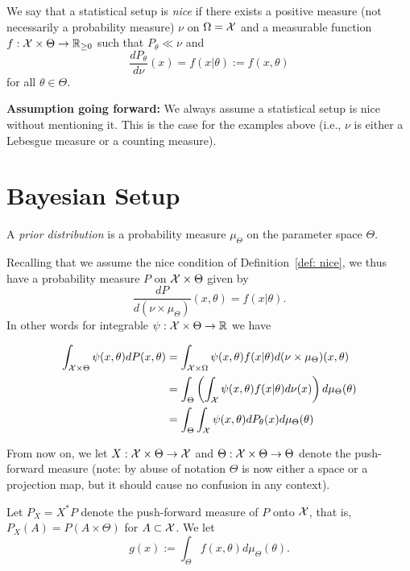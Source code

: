 \documentclass[twoside, a4paper, 10pt]{amsart}
\begin{document}
\begin{mydef} \label{def: nice} We say that a statistical setup is \textit{nice} if there exists a positive measure (not necessarily a probability measure) $\nu$ on $\Omega = \mathcal{X}$ and a measurable function $f:\mathcal{X} \times \Theta \to \mathbb{R}_{\geq 0}$ such that $P_{\theta} \ll \nu$ and $$\frac{dP_{\theta}}{d\nu} (x) = f(x|\theta) := f(x, \theta)$$ for all $\theta \in \Theta$.

\end{mydef}

\textbf{Assumption going forward:} We always assume a statistical setup is nice without mentioning it. This is the case for the examples above (i.e., $\nu$ is either a Lebesgue measure or a counting measure).

\section{Bayesian Setup}

\begin{mydef} A \textit{prior distribution} is a probability measure $\mu_{\Theta}$ on the parameter space $\Theta$. \end{mydef}

Recalling that we assume the nice condition of Definition~\ref{def: nice}, we thus have a probability measure $P$ on $\mathcal{X} \times \Theta$ given by $$\frac{dP}{d(\nu \times \mu_{\Theta})}(x,\theta) = f(x|\theta).$$ In other words for integrable $\psi:\mathcal{X} \times \Theta \to \mathbb{R}$ we have 

\begin{align*} \int_{\mathcal{X} \times \Theta} \psi(x,\theta) dP(x,\theta) &= \int_{\mathcal{X} \times \Omega } \psi(x,\theta) f(x|\theta) d(\nu \times \mu_{\Theta}) (x,\theta) \\ &= \int_{\Theta} \left( \int_{\mathcal{X}} \psi(x,\theta) f(x|\theta) d\nu(x) \right) d\mu_{\Theta}(\theta) \\
&=  \int_{\Theta} \int_{\mathcal{X}} \psi(x,\theta) dP_{\theta}(x) d\mu_{\Theta}(\theta)   \end{align*}

From now on, we let $X:\mathcal{X} \times \Theta \to \mathcal{X}$ and $\Theta:\mathcal{X} \times \Theta \to \Theta$ denote the push-forward measure (note: by abuse of notation $\Theta$ is now either a space or a projection map, but it should cause no confusion in any context).

Let $P_X=X^*P$ denote the push-forward measure of $P$ onto $\mathcal{X}$, that is, $P_X(A) = P(A \times \Theta)$ for $A \subset \mathcal{X}$. We let $$g(x) := \int_{\Theta} f(x,\theta) d\mu_{\Theta}(\theta).$$
\end{document}
